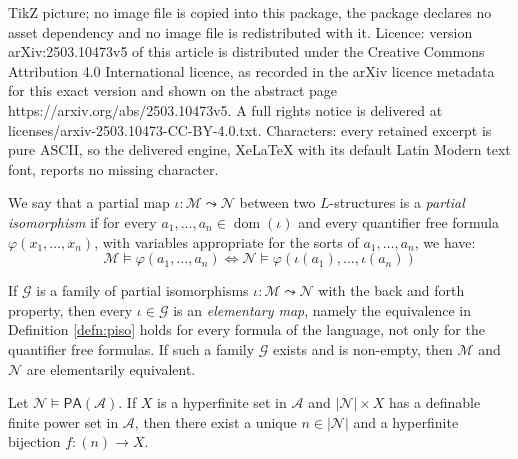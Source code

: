 \documentclass[10pt,a4paper]{amsart}
\newcommand{\PA}{\mathsf{PA}}
\newcommand{\ca}{\mathcal}
\newcommand{\dom}{\operatorname{dom}}
\newcommand{\pto}{\leadsto} %
\begin{document}
TikZ picture; no image file is copied into this package, the package declares no asset dependency and no image file is redistributed with it. Licence: version arXiv:2503.10473v5 of this article is distributed under the Creative Commons Attribution 4.0 International licence, as recorded in the arXiv licence metadata for this exact version and shown on the abstract page https://arxiv.org/abs/2503.10473v5. A full rights notice is delivered at licenses/arxiv-2503.10473-CC-BY-4.0.txt. Characters: every retained excerpt is pure ASCII, so the delivered engine, XeLaTeX with its default Latin Modern text font, reports no missing character.
\begin{defn}\label{defn:piso}
We say that a partial map $\iota: \ca M \pto \ca N $ between two $L$-structures is a {\em partial isomorphism} if for every $a_1, \ldots, a_n \in \dom(\iota )$ and every quantifier free formula 
%
$\varphi(x_1, \ldots, x_n)$, with variables appropriate for the sorts of $a_1, \ldots, a_n$, we have: 
%
\begin{equation*}
\ca M \models \varphi(a_1, \ldots, a_n) \iff \ca N \models \varphi (\iota (a_1), \ldots, \iota (a_n))
\end{equation*}
\end{defn}

\begin{prop}\label{prop:back forth}
If $\ca G$ is a family of partial isomorphisms $\iota: \ca M \pto \ca N$ with the back and forth property, then every $\iota \in \ca G$ is an \emph{elementary map}, namely the equivalence in Definition \ref{defn:piso} holds for every formula of the language, not only for the quantifier free formulas. If such a family $\ca G$ exists and is non-empty, then $\ca M$ and $\ca N$ are elementarily equivalent. 
\end{prop}

\begin{prop}\label{prop:enumeration}
Let $\ca N \models \PA(\ca A)$. 
If $X$ is a hyperfinite set in $\ca A$ and $|\ca N| \times X$ has a definable finite power set in $\ca A$, then there exist a unique $n\in |\ca N|$ and a hyperfinite bijection $f:(n)\to X$.
\end{prop}
\end{document}
